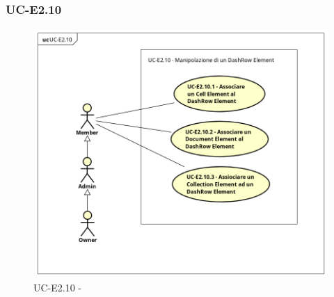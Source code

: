     
\subsubsection{UC-E2.10}
 

    \begin{figure}[H]
      \begin{center}
        \includegraphics[width=12cm]{res/img/UCEditor/UC-E2.10.png}
      \caption{UC-E2.10 - }
      \end{center} 
    \end{figure}

